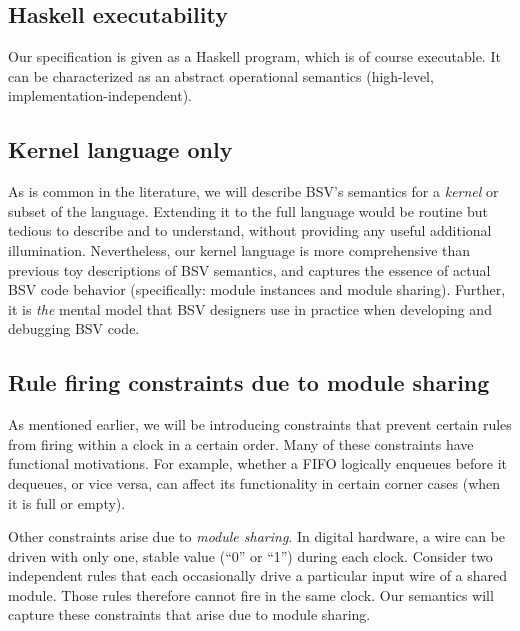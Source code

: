 \documentclass[11pt]{article}
\begin{document}

\subsection{Haskell executability}

Our specification is given as a Haskell program, which is of course
executable.  It can be characterized as an abstract operational
semantics (high-level, implementation-independent).


\subsection{Kernel language only}

As is common in the literature, we will describe BSV's semantics for a
\emph{kernel} or subset of the language.  Extending it to the full
language would be routine but tedious to describe and to understand,
without providing any useful additional illumination.  Nevertheless,
our kernel language is more comprehensive than previous toy
descriptions of BSV semantics, and captures the essence of actual BSV
code behavior (specifically: module instances and module sharing).
Further, it is \emph{the} mental model that BSV designers use in
practice when developing and debugging BSV code.


\subsection{Rule firing constraints due to module sharing}

As mentioned earlier, we will be introducing constraints that prevent
certain rules from firing within a clock in a certain order.  Many of
these constraints have functional motivations.  For example, whether a
FIFO logically enqueues before it dequeues, or vice versa, can affect
its functionality in certain corner cases (when it is full or empty).

Other constraints arise due to \emph{module sharing}.  In digital
hardware, a wire can be driven with only one, stable value (``0'' or
``1'') during each clock.  Consider two independent rules that each
occasionally drive a particular input wire of a shared module.  Those
rules therefore cannot fire in the same clock.  Our semantics will
capture these constraints that arise due to module sharing.
\end{document}
